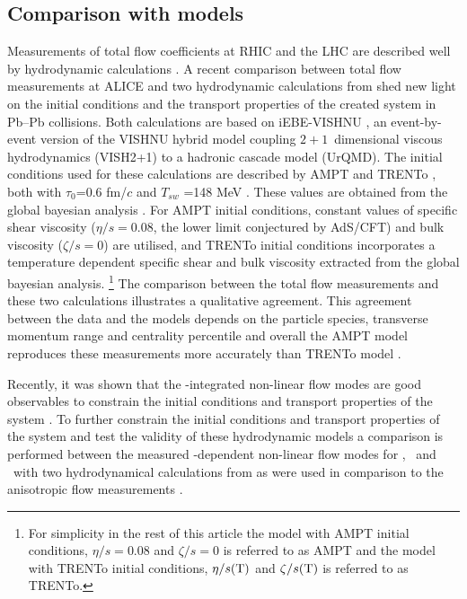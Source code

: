 \documentclass[ALICE,manyauthors]{cernphprep}
\begin{document}
\newpage
\subsection{Comparison with models}
\label{SubSec:hydro}

Measurements of total flow coefficients at RHIC and the LHC are described well by hydrodynamic calculations \cite{Xu:2016hmp, McDonald:2016vlt, Zhao:2017yhj}. A recent comparison between total flow measurements at ALICE \cite{Acharya:2018zuq} and two hydrodynamic calculations from \cite{Zhao:2017yhj} shed new light on the initial conditions and the transport properties of the created system in Pb--Pb collisions. Both calculations are based on iEBE-VISHNU \cite{Shen:2014vra}, an event-by-event version of the VISHNU hybrid model \cite{Song:2010aq} coupling $2+1$~dimensional viscous hydrodynamics (VISH2+1) \cite{Song:2007fn} to a hadronic cascade model (UrQMD). The initial conditions used for these calculations are described by AMPT \cite{Lin:2004en} and TRENTo \cite{Moreland:2014oya}, both with $\tau_{0}$=0.6 fm/$c$ and $T_{sw}$ =148 MeV \cite{Bernhard:2016tnd}. These values are obtained from the global bayesian analysis \cite{Bernhard:2016tnd}. For  AMPT initial conditions, constant values of specific shear viscosity ($\eta/s =0.08$, the lower limit conjectured by AdS/CFT) and bulk viscosity ($\zeta/s = 0$) are utilised, and TRENTo \cite{Moreland:2014oya} initial conditions incorporates a temperature dependent specific shear and bulk viscosity extracted from the global bayesian analysis. \footnote{ For simplicity in the rest of this article the model with AMPT initial conditions, $\eta/s =0.08$ and $\zeta/s =0$ is referred to as AMPT and the model with TRENTo initial conditions, $\eta/s(\rm{T})$ and $\zeta/s(\rm{T})$ is referred to as TRENTo.} The comparison between the total flow measurements and these two calculations illustrates a qualitative agreement. This agreement between the data and the models depends on the particle species, transverse momentum range and centrality percentile and overall the AMPT model reproduces these measurements more accurately than TRENTo model \cite{Acharya:2018zuq}.

Recently, it was shown that the \pT-integrated non-linear flow modes are good observables to constrain the initial conditions and transport properties of the system \cite{Acharya:2017zfg}. To further constrain the initial conditions and transport properties of the system and test the validity of these hydrodynamic models a comparison is performed between the measured \pT-dependent non-linear flow modes for \pion, \kaon~and \proton~with two hydrodynamical calculations from \cite{Zhao:2017yhj} as were used in comparison to the anisotropic flow measurements \cite{Acharya:2018zuq}. 
\end{document}
